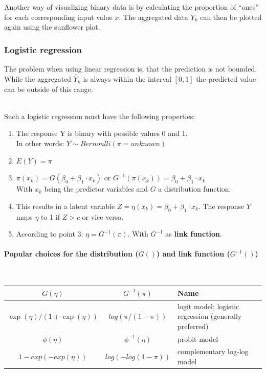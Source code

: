 Another way of visualizing binary data is by calculating the proportion of ``ones'' for each corresponding input value $x$. The aggregated data $\tilde{Y_k}$ can then be plotted again using the sunflower plot.

\subsubsection{Logistic regression}

The problem when using linear regression is, that the prediction is not bounded. While the aggregated $\tilde{Y_k}$ is always within the interval $[0, 1]$ the predicted value can be outside of this range.

\mbox{}\\
Such a logistic regression must have the following properties:
\begin{enumerate}
	\tightlist
	\item The response Y is binary with possible values 0 and 1.\\
	In other words: $Y \sim Bernoulli(\pi=unknown)$
	\item $E(Y) = \pi$
	\item $\pi(x_k) = G(\beta_0 + \beta_1 \cdot x_k)$ or $G^{-1}(\pi(x_k)) = \beta_0 + \beta_1 \cdot x_k$\\
	With $x_k$ being the predictor variables and $G$ a distribution function.
	\item This results in a latent variable $Z =\eta(x_k) = \beta_0 + \beta_1 \cdot x_k$. The response $Y$ maps $\eta$ to 1 if $Z > c$ or vice versa.
	\item According to point 3: $\eta = G^{-1}(\pi)$. With $G^{-1}$ as \textbf{link function}.
\end{enumerate}

\paragraph{Popular choices for the distribution ($G()$) and link function ($G^{-1}()$)}\mbox{}\\
\begin{tabular}{ccl}
	\hline 
	$G(\eta)$ & $G^{-1}(\pi)$ & Name \\ 
	\hline 
	$\exp(\eta)/(1+\exp(\eta))$& $log(\pi/(1-\pi))$  & logit model; logistic regression (generally preferred) \\ 
	$\phi(\eta)$ & $\phi^{-1}(\eta)$ & probit model \\
	$1-exp(-exp(\eta))$ & $log(-log(1-\pi))$ & complementary log-log model \\
	\hline 
\end{tabular}

